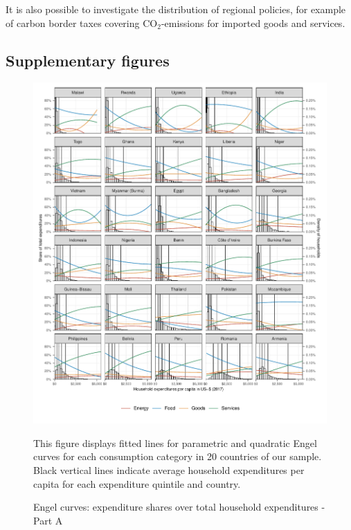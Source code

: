 \documentclass[12pt, a4paper]{article}
\newenvironment{subcaption}
{\strut
\vspace{-5pt}
\begin{minipage}[b]{0.9\textwidth}
  \hspace*{-\parindent}
  \footnotesize}
 {\end{minipage}}
\begin{document}
It is also possible to investigate the distribution of regional policies, for example of carbon border taxes covering CO$_{2}$-emissions for imported goods and services. 

\clearpage

\renewcommand\thefigure{\thesection.\arabic{figure}}
\renewcommand\thetable{\thesection.\arabic{table}}
\setcounter{figure}{0}
\setcounter{table}{0}

\subsection{Supplementary figures} \label{sec:figures}

\begin{figure}[ht!]
  \centering
  \caption{Engel curves: expenditure shares over total household expenditures - Part A} \label{fig:A1}
  \includegraphics{Analysis_Parametric_Engel_Curves/Parametric_EC_0_A}
  \begin{subcaption}
    This figure displays fitted lines for parametric and quadratic Engel curves for each consumption category in 20 countries of our sample. Black vertical lines indicate average household expenditures per capita for each expenditure quintile and country.
  \end{subcaption}

\end{figure}
\end{document}
